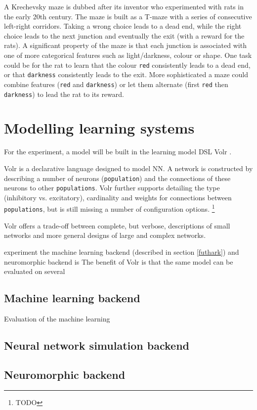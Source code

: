 A Krechevsky maze is dubbed after its inventor who experimented with rats in the early 20th century.
The maze is built as a T-maze with a series of consecutive left-right corridors.
Taking a wrong choice leads to a dead end, while the right choice leads to the next junction and eventually the exit (with a reward for the rats).
A significant property of the maze is that each junction is associated with one of more categorical features such as light/darkness, colour or shape.
One task could be for the rat to learn that the colour \texttt{red} consistently leads to a dead end, or that \texttt{darkness} consistently leads to the exit.
More sophisticated a maze could combine features (\texttt{red} and \texttt{darkness}) or let them alternate (first \texttt{red} then \texttt{darkness}) to lead the rat to its reward.

\section{Modelling learning systems} \label{sec:learning}
For the experiment, a model will be built in the learning model DSL Volr \autocite{Pedersen2018:volr-report}.

Volr is a declarative language designed to model \gls{NN}.
A network is constructed by describing a number of neurons (\texttt{population}) and the connections of these neurons to other \texttt{populations}.
Volr further supports detailing the type (inhibitory vs. excitatory), cardinality and weights for connections between \texttt{populations}, but is still missing a number of configuration options.
\footnote{TODO}

Volr offers a trade-off between complete, but verbose, descriptions of small networks and more general designs of large and complex networks.

 experiment the machine learning backend (described in section \ref{futhark}) and neuromorphic backend is
The benefit of Volr is that the same model can be evaluated on several

\subsection{Machine learning backend} \label{sec:futhark}
Evaluation of the machine learning

\subsection{Neural network simulation backend}

\subsection{Neuromorphic backend} \label{sec:neuromorphic}
